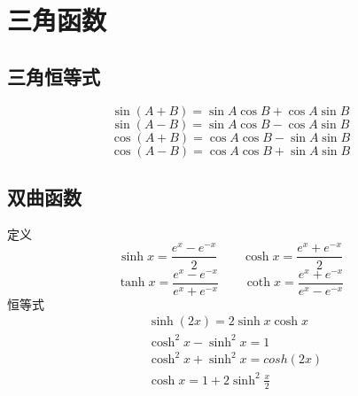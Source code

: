 \section{三角函数}
\subsection{三角恒等式}
$$\sin(A+B)= \sin A\cos B+\cos A\sin B$$
$$\sin(A-B)= \sin A\cos B-\cos A\sin B$$
$$\cos(A+B)= \cos A\cos B-\sin A\sin B$$
$$\cos(A-B)= \cos A\cos B+\sin A\sin B$$
\subsection{双曲函数}
定义
$$\sinh x = \frac{e^x-e^{-x}}{2}\qquad \cosh x = \frac{e^x+e^{-x}}{2}$$
$$\tanh x = \frac{e^x-e^{-x}}{e^x+e^{-x}}\qquad \coth x = \frac{e^x+e^{-x}}{e^x-e^{-x}}$$
恒等式
\begin{align}
&\sinh (2x) = 2\sinh x\cosh x \label{eq:hyperbolic_functions_1} \\
&\cosh^2x-\sinh^2x = 1 \label{eq:hyperbolic_functions_2} \\
&\cosh^2x+\sinh^2x = cosh (2x) \label{eq:hyperbolic_functions_3} \\
&\cosh x = 1+2\sinh^2\frac{x}{2} \label{eq:hyperbolic_functions_4}
\end{align}
